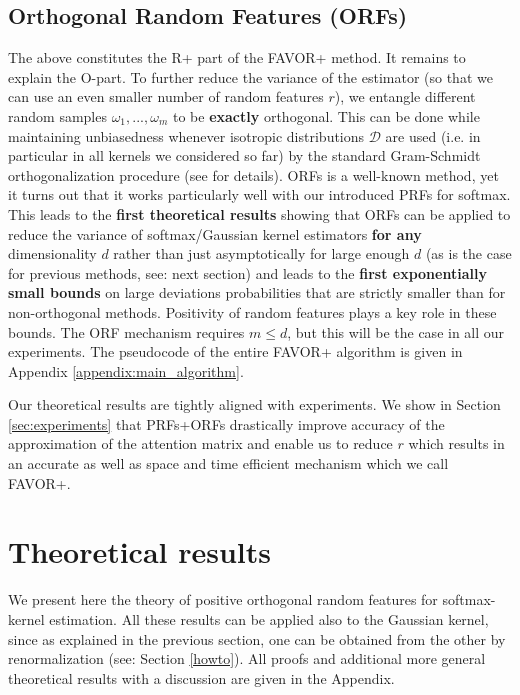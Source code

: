 \subsection{Orthogonal Random Features (ORFs)} The above constitutes the R+ part of the FAVOR+ method. It remains to explain the O-part. To further reduce the variance of the estimator (so that we can use an even smaller number of random features $r$), we entangle different random samples $\omega_{1},...,\omega_{m}$ to be \textbf{exactly} orthogonal. This can be done while maintaining unbiasedness whenever isotropic distributions $\mathcal{D}$ are used (i.e. in particular in all kernels we considered so far) by the standard Gram-Schmidt orthogonalization procedure (see \citep{unreas} for details). ORFs is a well-known method, yet it turns out that it works particularly well with our introduced PRFs for softmax. This leads to the \textbf{first theoretical results} showing that ORFs can be applied to reduce the variance of softmax/Gaussian kernel estimators \textbf{for any} dimensionality $d$ rather than just asymptotically for large enough $d$ (as is the case for previous methods, see: next section) and leads to the \textbf{first exponentially small bounds} on large deviations probabilities that are strictly smaller than for non-orthogonal methods. Positivity of random features plays a key role in these bounds. The ORF mechanism requires $m \leq d$, but this will be the case in all our experiments. The pseudocode of the entire FAVOR+ algorithm is given in Appendix \ref{appendix:main_algorithm}.

Our theoretical results are tightly aligned with experiments. We show in Section \ref{sec:experiments} that PRFs+ORFs drastically improve accuracy of the approximation of the attention matrix and enable us to reduce $r$ which results in an accurate as well as space and time efficient mechanism which we call FAVOR+.

\section{Theoretical results}
\label{sec:theory}

We present here the theory of positive orthogonal random features for softmax-kernel estimation. All these results can be applied also to the Gaussian kernel, since as explained in the previous section, one can be obtained from the other by renormalization (see: Section \ref{howto}).
All proofs and additional more general theoretical results with a discussion are given in the Appendix.

